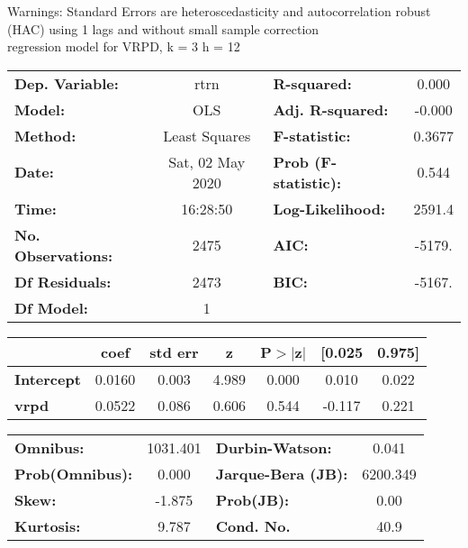 Warnings: \newline
 [1] Standard Errors are heteroscedasticity and autocorrelation robust (HAC) using 1 lags and without small sample correction\\ 

regression model for VRPD, k = 3 h = 12\begin{center}
\begin{tabular}{lclc}
\toprule
\textbf{Dep. Variable:}    &       rtrn       & \textbf{  R-squared:         } &     0.000   \\
\textbf{Model:}            &       OLS        & \textbf{  Adj. R-squared:    } &    -0.000   \\
\textbf{Method:}           &  Least Squares   & \textbf{  F-statistic:       } &    0.3677   \\
\textbf{Date:}             & Sat, 02 May 2020 & \textbf{  Prob (F-statistic):} &    0.544    \\
\textbf{Time:}             &     16:28:50     & \textbf{  Log-Likelihood:    } &    2591.4   \\
\textbf{No. Observations:} &        2475      & \textbf{  AIC:               } &    -5179.   \\
\textbf{Df Residuals:}     &        2473      & \textbf{  BIC:               } &    -5167.   \\
\textbf{Df Model:}         &           1      & \textbf{                     } &             \\
\bottomrule
\end{tabular}
\begin{tabular}{lcccccc}
                   & \textbf{coef} & \textbf{std err} & \textbf{z} & \textbf{P$> |$z$|$} & \textbf{[0.025} & \textbf{0.975]}  \\
\midrule
\textbf{Intercept} &       0.0160  &        0.003     &     4.989  &         0.000        &        0.010    &        0.022     \\
\textbf{vrpd}      &       0.0522  &        0.086     &     0.606  &         0.544        &       -0.117    &        0.221     \\
\bottomrule
\end{tabular}
\begin{tabular}{lclc}
\textbf{Omnibus:}       & 1031.401 & \textbf{  Durbin-Watson:     } &    0.041  \\
\textbf{Prob(Omnibus):} &   0.000  & \textbf{  Jarque-Bera (JB):  } & 6200.349  \\
\textbf{Skew:}          &  -1.875  & \textbf{  Prob(JB):          } &     0.00  \\
\textbf{Kurtosis:}      &   9.787  & \textbf{  Cond. No.          } &     40.9  \\
\bottomrule
\end{tabular}
\end{center}

